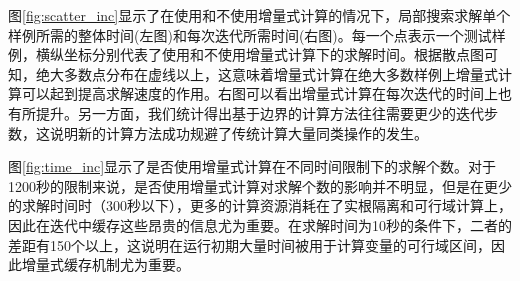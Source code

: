 图\ref{fig:scatter_inc}显示了在使用和不使用增量式计算的情况下，局部搜索求解单个样例所需的整体时间(左图)和每次迭代所需时间(右图)。每一个点表示一个测试样例，横纵坐标分别代表了使用和不使用增量式计算下的求解时间。根据散点图可知，绝大多数点分布在虚线以上，这意味着增量式计算在绝大多数样例上增量式计算可以起到提高求解速度的作用。右图可以看出增量式计算在每次迭代的时间上也有所提升。另一方面，我们统计得出基于边界的计算方法往往需要更少的迭代步数，这说明新的计算方法成功规避了传统计算大量同类操作的发生。


图\ref{fig:time_inc}显示了是否使用增量式计算在不同时间限制下的求解个数。对于1200秒的限制来说，是否使用增量式计算对求解个数的影响并不明显，但是在更少的求解时间时（300秒以下），更多的计算资源消耗在了实根隔离和可行域计算上，因此在迭代中缓存这些昂贵的信息尤为重要。在求解时间为10秒的条件下，二者的差距有150个以上，这说明在运行初期大量时间被用于计算变量的可行域区间，因此增量式缓存机制尤为重要。

